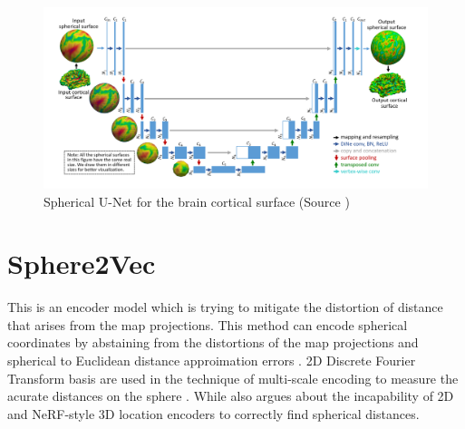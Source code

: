 \begin{figure}[h]
    \centering
    \includegraphics[width=1.0\linewidth]{figures/chapter-4/spherical_unet.png}
    \caption{Spherical U-Net for the brain cortical surface (Source \cite{zhao2019spherical}) }
    \label{fig:spherical-unet}
\end{figure}

\section{Sphere2Vec}
This is an encoder model which is trying to mitigate the distortion of distance that arises from the map projections. This method can encode spherical coordinates by abstaining from the distortions of the map projections and spherical to Euclidean distance approimation errors \cite{mai2023sphere2vec}. 2D Discrete Fourier Transform basis are used in the technique of multi-scale encoding to measure the acurate distances on the sphere \cite{mai2023sphere2vec}. While \cite{mai2023sphere2vec} also argues about the incapability of 2D and NeRF-style 3D location encoders to correctly find spherical distances.